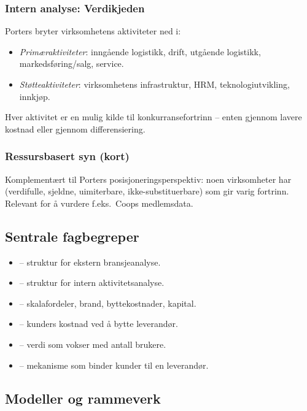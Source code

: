 \subsubsection*{Intern analyse: Verdikjeden}
Porters  bryter virksomhetens aktiviteter ned i:
\begin{itemize}
  \item \emph{Primæraktiviteter}: inngående logistikk, drift, utgående
    logistikk, markedsføring/salg, service.
  \item \emph{Støtteaktiviteter}: virksomhetens infrastruktur, HRM,
    teknologiutvikling, innkjøp.
\end{itemize}
Hver aktivitet er en mulig kilde til konkurransefortrinn -- enten gjennom lavere
kostnad eller gjennom differensiering.

\subsubsection*{Ressursbasert syn (kort)}
Komplementært til Porters posisjoneringsperspektiv: noen virksomheter har
 (verdifulle, sjeldne, uimiterbare, ikke-substituerbare)
som gir varig fortrinn. Relevant for å vurdere f.eks.\ Coops medlemsdata.

\subsection{Sentrale fagbegreper}
\begin{itemize}
  \item {} -- struktur for ekstern bransjeanalyse.
  \item {} -- struktur for intern aktivitetsanalyse.
  \item {} -- skalafordeler, brand, byttekostnader, kapital.
  \item {} -- kunders kostnad ved å bytte leverandør.
  \item {} -- verdi som vokser med antall brukere.
  \item {} -- mekanisme som binder kunder til en leverandør.
\end{itemize}

\subsection{Modeller og rammeverk}


